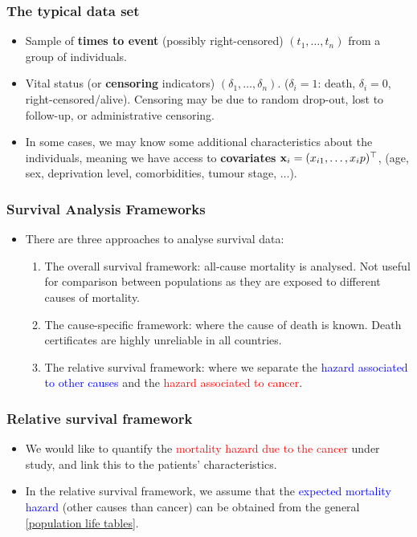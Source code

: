 \documentclass[10pt,handout,compress]{beamer}
\begin{document}
\begin{frame}
\frametitle{The typical data set}
\begin{itemize}
\item Sample of \textbf{times to event} (possibly right-censored) $(t_1,\ldots,t_n)$ from a group of individuals.
\pause
\item Vital status (or \textbf{censoring} indicators) $(\delta_1,\ldots,\delta_n)$. ($\delta_i=1$: death, $\delta_i=0$, right-censored/alive). \pause Censoring may be due to random drop-out, lost to follow-up, or administrative censoring.
\pause
\item In some cases, we may know some additional characteristics about the individuals, meaning we have access to \textbf{covariates} ${\bf x}_i = (x_{i1},\ldots,x_{i}p)^{\top}$, (age, sex, deprivation level, comorbidities, tumour stage, $\ldots$).
\end{itemize}
\end{frame}

\begin{frame}
\frametitle{Survival Analysis Frameworks}
\begin{itemize}
\item There are three approaches to analyse survival data:\pause
\begin{enumerate}
  \item The overall survival framework: all-cause mortality is analysed. \pause Not useful for comparison between populations as they are exposed to different causes of mortality. \pause
  \item The cause-specific framework: where the cause of death is known. \pause Death certificates are highly unreliable in all countries. \pause
  \item The relative survival framework: where we separate the \textcolor{blue}{hazard associated to other causes} and the \textcolor{red}{hazard associated to cancer}.
\end{enumerate}
\end{itemize}
\end{frame}



\begin{frame}
\frametitle{Relative survival framework}
\begin{itemize}
\item We would like to quantify the \textcolor{red}{mortality hazard due to the cancer} under study, and link this to the patients' characteristics. \pause

\item In the relative survival framework, we assume that the \textcolor{blue}{expected mortality hazard} (other causes than cancer) can be obtained from the general \href{https://www.ons.gov.uk/peoplepopulationandcommunity/birthsdeathsandmarriages/lifeexpectancies/datasets/nationallifetablesunitedkingdomreferencetables}{[population life tables]}.
\end{itemize}
\end{frame}
\end{document}
